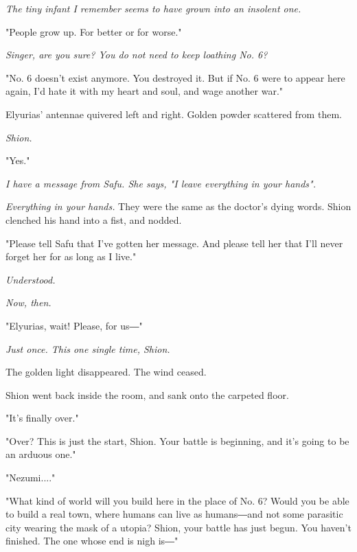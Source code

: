 \myspace

\emph{The tiny infant I remember seems to have grown into an insolent one.}

\myspace

"People grow up. For better or for worse."

\myspace

\emph{Singer, are you sure? You do not need to keep loathing No. 6?}

\myspace

"No. 6 doesn't exist anymore. You destroyed it. But if No. 6 were to
appear here again, I'd hate it with my heart and soul, and wage another
war."

Elyurias' antennae quivered left and right. Golden powder scattered from
them.

\myspace

\emph{Shion.}

\myspace

"Yes."

\myspace

\emph{I have a message from Safu. She says, "I leave everything in your
hands".}

\myspace

\emph{Everything in your hands.} They were the same as the doctor's dying
words. Shion clenched his hand into a fist, and nodded.

"Please tell Safu that I've gotten her message. And please tell her that
I'll never forget her for as long as I live."

\myspace

\emph{Understood.}

\emph{Now, then.}

\myspace

"Elyurias, wait! Please, for us―"

\myspace

\emph{Just once. This one single time, Shion.}

\myspace

The golden light disappeared. The wind ceased.

\myspace

Shion went back inside the room, and sank onto the carpeted floor.

"It's finally over."

"Over? This is just the start, Shion. Your battle is beginning, and it's
going to be an arduous one."

"Nezumi...."

"What kind of world will you build here in the place of No. 6? Would you
be able to build a real town, where humans can live as humans―and not
some parasitic city wearing the mask of a utopia? Shion, your battle has
just begun. You haven't finished. The one whose end is nigh is―"

